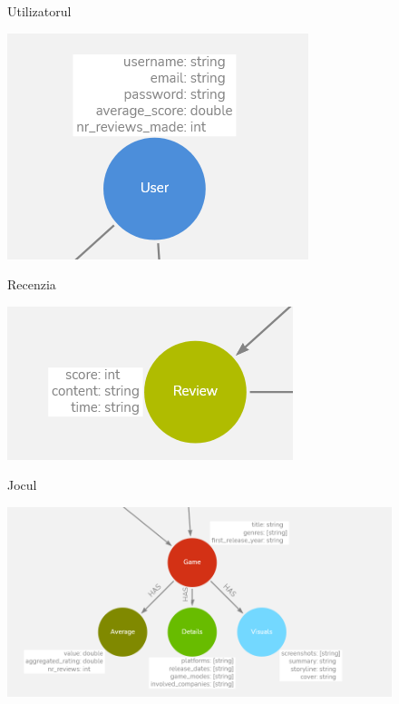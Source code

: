 \documentclass[12pt,a4paper]{report}
\begin{document}
\begin{figure}[H]
\centering
\caption{Utilizatorul}
\includegraphics[]{exemplu_6_neo4j}
\caption*{}
\end{figure}

\begin{figure}[H]
\centering
\caption{Recenzia}
\includegraphics[]{exemplu_7_neo4j}
\caption*{}
\end{figure}

\begin{figure}[H]
\centering
\caption{Jocul}
\includegraphics[scale = 0.6]{exemplu_8_neo4j}
\caption*{}
\end{figure}
\end{document}
